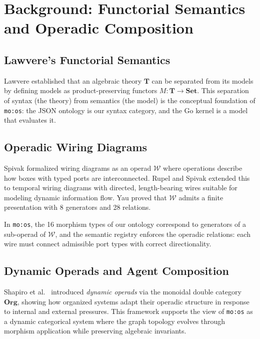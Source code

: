 \documentclass[submission,copyright,creativecommons]{eptcs}
\begin{document}
\section{Background: Functorial Semantics and Operadic Composition}
\label{sec:background}

\subsection{Lawvere's Functorial Semantics}

Lawvere \cite{lawvere1963} established that an algebraic theory $\mathbf{T}$
can be separated from its models by defining models as product-preserving
functors $M\colon \mathbf{T} \to \mathbf{Set}$. This separation of syntax
(the theory) from semantics (the model) is the conceptual foundation of
\texttt{mo:os}: the JSON ontology is our syntax category, and the Go kernel is
a model that evaluates it.

\subsection{Operadic Wiring Diagrams}

Spivak \cite{spivak2013} formalized wiring diagrams as an operad
$\mathcal{W}$ where operations describe how boxes with typed ports are
interconnected. Rupel and Spivak \cite{spivak2013operad} extended this to
temporal wiring diagrams with directed, length-bearing wires suitable for
modeling dynamic information flow. Yau \cite{yau2018} proved that
$\mathcal{W}$ admits a finite presentation with 8 generators and 28 relations.

In \texttt{mo:os}, the 16 morphism types of our ontology correspond to
generators of a sub-operad of $\mathcal{W}$, and the semantic registry
enforces the operadic relations: each wire must connect admissible port types
with correct directionality.

\subsection{Dynamic Operads and Agent Composition}

Shapiro et al.\ \cite{shapiro2022} introduced \emph{dynamic operads} via the
monoidal double category $\mathbf{Org}$, showing how organized systems adapt
their operadic structure in response to internal and external pressures. This
framework supports the view of \texttt{mo:os} as a dynamic categorical system
where the graph topology evolves through morphism application while preserving
algebraic invariants.
\end{document}
